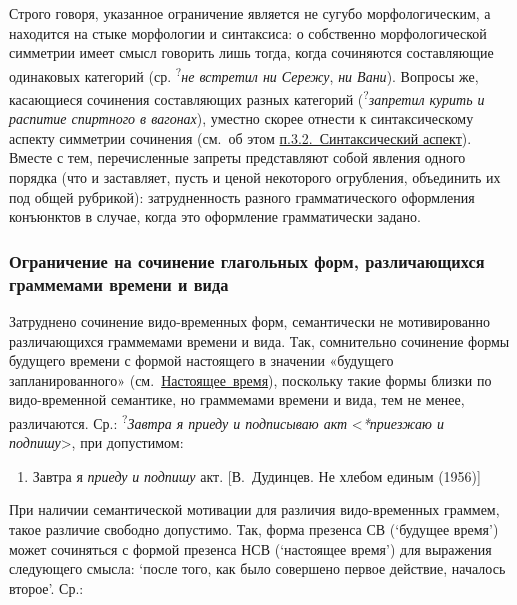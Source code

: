 Строго говоря, указанное ограничение является не сугубо морфологическим,
а находится на стыке морфологии и синтаксиса: о собственно
морфологической симметрии имеет смысл говорить лишь тогда, когда
сочиняются составляющие одинаковых категорий (ср.
\textsuperscript{?}\textit{не встретил ни Сережу}, \textit{ни Вани}).
Вопросы же, касающиеся сочинения составляющих разных категорий
(\textsuperscript{?}\textit{запретил курить и распитие спиртного в
  вагонах}), уместно скорее отнести к синтаксическому аспекту симметрии
сочинения (см.~об этом \underline{п.3.2.~Синтаксический аспект}). Вместе
с тем, перечисленные запреты представляют собой явления одного порядка
(что и заставляет, пусть и ценой некоторого огрубления, объединить их
под общей рубрикой): затрудненность разного грамматического оформления
конъюнктов в случае, когда это оформление грамматически задано.

\subsubsection{Ограничение на сочинение глагольных форм, различающихся
  граммемами времени и
  вида}\label{ux43eux433ux440ux430ux43dux438ux447ux435ux43dux438ux435-ux43dux430-ux441ux43eux447ux438ux43dux435ux43dux438ux435-ux433ux43bux430ux433ux43eux43bux44cux43dux44bux445-ux444ux43eux440ux43c-ux440ux430ux437ux43bux438ux447ux430ux44eux449ux438ux445ux441ux44f-ux433ux440ux430ux43cux43cux435ux43cux430ux43cux438-ux432ux440ux435ux43cux435ux43dux438-ux438-ux432ux438ux434ux430}

Затруднено сочинение видо-временных форм, семантически не мотивированно
различающихся граммемами времени и вида. Так, сомнительно сочинение
формы будущего времени с формой настоящего в значении «будущего
запланированного» (см.~\underline{Настоящее~время}), поскольку такие
формы близки по видо-временной семантике, но граммемами времени и вида,
тем не менее, различаются. Ср.: \textsuperscript{?}\textit{Завтра я приеду
  и подписываю акт} \textless{}\textit{*приезжаю и подпишу}\textgreater, при
допустимом:

\begin{enumerate}
  \def\labelenumi{(\arabic{enumi})}
  \setcounter{enumi}{4}
  \item
        Завтра я \textit{приеду} \textit{и} \textit{подпишу} акт. {[}В.~Дудинцев. Не
        хлебом единым (1956){]}
\end{enumerate}

При наличии семантической мотивации для различия видо-временных граммем,
такое различие свободно допустимо. Так, форма презенса СВ (`будущее
время') может сочиняться с формой презенса НСВ (`настоящее время') для
выражения следующего смысла: `после того, как было совершено первое
действие, началось второе'. Ср.:


